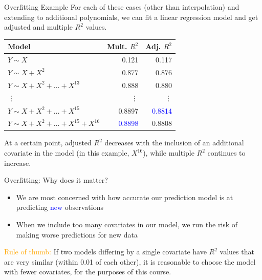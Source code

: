 \documentclass[10pt,t]{beamer}
\begin{document}
\begin{frame}{Overfitting Example}
For each of these cases (other than interpolation) and extending to additional polynomials, we can fit a linear regression model and get adjusted and multiple $R^2$ values.

\vspace{0.3cm}

\begin{table}
	\begin{tabular}{l|r|r}

Model & Mult. $R^2$ & Adj. $R^2$ \\
\hline
$Y \sim X$ & 0.121 & 0.117\\
\hline
$Y \sim X + X^2$ & 0.877 & 0.876\\
\hline
$Y \sim X + X^2 + \dots + X^{13}$ & 0.888 & 0.880 \\
\hline
\vdots & \vdots & \vdots \\
\hline
$Y \sim X + X^2 + \dots + X^{15}$ & 0.8897 & \textcolor{blue}{0.8814} \\
\hline
$Y \sim X + X^2 + \dots + X^{15} + X^{16}$ & \textcolor{blue}{0.8898} & 0.8808
\end{tabular}
\end{table}

\vspace{0.3cm} At a certain point, adjusted $R^2$ decreases with the inclusion of an additional covariate in the model (in this example, $X^{16}$), while multiple $R^2$ continues to increase.
	
\end{frame}

\begin{frame}{Overfitting: Why does it matter?}
	\vspace{-0.6cm}
	
	\begin{itemize}
\item We are most concerned with how accurate our prediction model is at predicting  \textcolor{blue}{new} observations 

\medskip

		\item When we include too many covariates in our model, we run the risk of making worse predictions for new data

\end{itemize}

\vspace{0.3cm}

\textcolor{orange}{Rule of thumb:} If two models differing by a single covariate have $R^2$ values that are very similar (within 0.01 of each other), it is reasonable to choose the model with fewer covariates, for the purposes of this course.
\end{frame}
\end{document}
